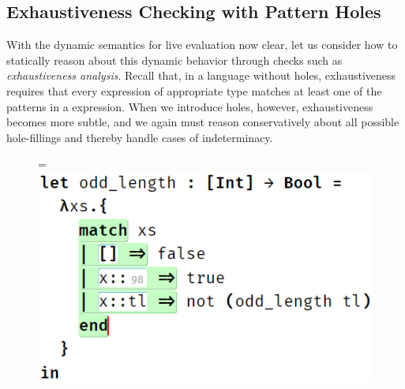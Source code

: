 \subsection{Exhaustiveness Checking with Pattern Holes}\label{sec:exhaustiveness}
With the dynamic semantics for live evaluation now clear, let us consider how to statically reason about this dynamic behavior through checks such as \emph{exhaustiveness analysis}. Recall that, in a language without holes, exhaustiveness requires that every expression of appropriate type matches at least one of the patterns in a  expression. When we introduce holes, however, exhaustiveness becomes more subtle, and we again must reason conservatively about all possible hole-fillings and thereby handle cases of indeterminacy.

\begin{figure}
	\centering
	=\hbox{\includegraphics[scale=0.45]{imgs/exhaustive.png}}%
\end{figure}
